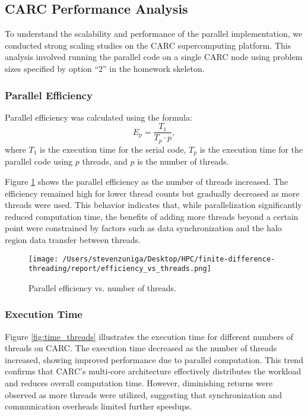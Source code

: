 \documentclass[12pt]{article}
\begin{document}
\subsection{CARC Performance Analysis}
To understand the scalability and performance of the parallel implementation, we conducted strong scaling studies on the CARC supercomputing platform. This analysis involved running the parallel code on a single CARC node using problem sizes specified by option “2” in the homework skeleton.

\subsubsection{Parallel Efficiency}
Parallel efficiency was calculated using the formula:
\[
E_p = \frac{T_1}{T_p \cdot p},
\]
where \( T_1 \) is the execution time for the serial code, \( T_p \) is the execution time for the parallel code using \( p \) threads, and \( p \) is the number of threads. 

Figure \ref{fig:efficiency_threads} shows the parallel efficiency as the number of threads increased. The efficiency remained high for lower thread counts but gradually decreased as more threads were used. This behavior indicates that, while parallelization significantly reduced computation time, the benefits of adding more threads beyond a certain point were constrained by factors such as data synchronization and the halo region data transfer between threads.

\begin{figure}[h!]
\centering
\texttt{[image: /Users/stevenzuniga/Desktop/HPC/finite-difference-threading/report/efficiency\_vs\_threads.png]}
\caption{Parallel efficiency vs. number of threads.}
\label{fig:efficiency_threads}
\end{figure}

\FloatBarrier
\subsubsection{Execution Time}
Figure \ref{fig:time_threads} illustrates the execution time for different numbers of threads on CARC. The execution time decreased as the number of threads increased, showing improved performance due to parallel computation. This trend confirms that CARC's multi-core architecture effectively distributes the workload and reduces overall computation time. However, diminishing returns were observed as more threads were utilized, suggesting that synchronization and communication overheads limited further speedups.
\end{document}

